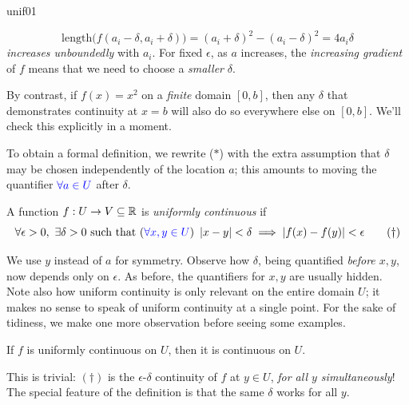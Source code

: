 \begin{example}{}{unif01}
\begin{minipage}[t]{0.34\linewidth}
	\end{minipage}\par
	\[
		\text{length}\bigl(f(a_i-\delta,a_i+\delta)\bigr) =(a_i+\delta)^2-(a_i-\delta)^2=4a_i\delta
	\]
	\emph{increases unboundedly} with $a_i$. For fixed $\epsilon$, as $a$ increases, the \emph{increasing gradient} of $f$ means that we need to choose a \emph{smaller} $\delta$.\medbreak
	
	By contrast, if $f(x)=x^2$ on a \emph{finite} domain $[0,b]$, then any $\delta$ that demonstrates continuity at $x=b$ will also do so everywhere else on $[0,b]$. We'll check this explicitly in a moment.
\end{example}


To obtain a formal definition, we rewrite ($\ast$) with the extra assumption that $\delta$ may be chosen independently of the location $a$; this amounts to moving the quantifier $\textcolor{blue}{\forall a\in U}$ after $\delta$.

\begin{defn}{}{}
	A function $f:U\to V\subseteq \mathbb{R}$ is \emph{uniformly continuous} if
	\[
		\forall\epsilon>0,\ \exists\delta>0\text{ such that }(\textcolor{blue}{\forall x,y\in U})\ \nm{x-y}<\delta\implies\nm{f(x)-f(y)}<\epsilon \tag{$\dag$}
	\]
\end{defn}

We use $y$ instead of $a$ for symmetry. Observe how $\delta$, being quantified \emph{before $x,y$}, now depends only on $\epsilon$. As before, the quantifiers for $x,y$ are usually hidden. Note also how uniform continuity is only relevant on the entire domain $U$; it makes no sense to speak of uniform continuity at a single point.
\smallbreak
For the sake of tidiness, we make one more observation before seeing some examples.

\begin{lemm}{}{}
	If $f$ is uniformly continuous on $U$, then it is continuous on $U$.
\end{lemm}

This is trivial: $(\dag)$ is the $\epsilon$-$\delta$ continuity of $f$ at $y\in U$, \emph{for all $y$ simultaneously}! The special feature of the definition is that the same $\delta$ works for all $y$.

\goodbreak


